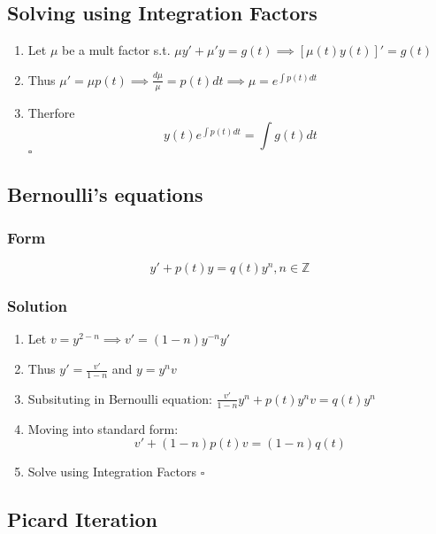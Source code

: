 \documentclass[11pt]{article}
\begin{document}
\subsection{Solving using Integration Factors}
\label{sec-9.2}

\begin{enumerate}
\item Let $\mu$ be a mult factor s.t. $\mu y' + \mu'y=g(t) \implies [\mu(t) y(t)]'= g(t)$
\item Thus $\mu'=\mu p(t) \implies \frac{d\mu}{\mu}=p(t)dt \implies
      \mu = e^{\int p(t)dt }$
\item Therfore
      \begin{equation}
      y(t)e^{\int p(t)dt}=\int g(t)dt
      \end{equation} $\square$
\end{enumerate}
\subsection{Bernoulli's equations}
\label{sec-9.3}

\subsubsection{Form}
\label{sec-9.3.1}

    \begin{equation}
    y'+p(t)y=q(t)y^n, n\in \mathbb{Z}
    \end{equation}
\subsubsection{Solution}
\label{sec-9.3.2}

\begin{enumerate}
\item Let $v=y^{2-n} \implies v'=(1-n)y^{-n}y'$
\item Thus $y'=\frac{v'}{1-n}$ and $y = y^n v$
\item Subsituting in Bernoulli equation: $\frac{v'}{1-n}y^n+p(t)y^nv=q(t)y^n$
\item Moving into standard form: 
       \begin{equation}
       v'+(1-n)p(t)v=(1-n)q(t)
       \end{equation}
\item Solve using Integration Factors $\square$
\end{enumerate}
\subsection{Picard Iteration}
\label{sec-9.4}
\end{document}
